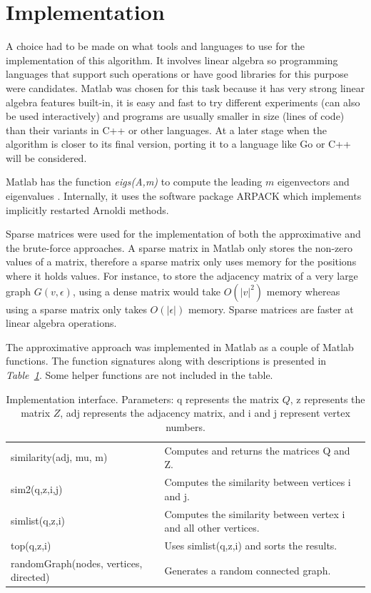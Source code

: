 \documentclass[12pt]{report}
\begin{document}
\section{Implementation}
%
A choice had to be made on what tools and languages to use for the implementation
of this algorithm. It involves linear algebra so programming languages that support
such operations or have good libraries for this purpose were candidates. Matlab
was chosen for this task because it has very strong linear algebra features built-in,
it is easy and fast to try different experiments (can also be used interactively)
and programs are usually smaller in size (lines of code) than their variants in C++
or other languages. At a later stage when the algorithm is closer to its final
version, porting it to a language like Go or C++ will be considered.


Matlab has the function \textit{eigs(A,m)} to compute the leading $m$ eigenvectors
and eigenvalues \cite{matlab:eigs}. Internally, it uses the software package ARPACK which implements
implicitly restarted Arnoldi methods. \cite{lehoucq1998arpack}


Sparse matrices were used for the implementation of both the approximative and
the brute-force approaches. A sparse matrix in Matlab only stores the non-zero
values of a matrix, therefore a sparse matrix only uses memory for the positions
where it holds values\cite{gilbert1992sparse}. For instance, to store the adjacency matrix of a very
large graph $G(v,\epsilon)$, using a dense matrix would take $O(|v|^2)$ memory
whereas using a sparse matrix only takes $O(|\epsilon|)$ memory. Sparse matrices
are faster at linear algebra operations.


The approximative approach was implemented in Matlab as a couple of Matlab functions.
The function signatures along with descriptions is presented in \emph{Table~\ref{tbl:interface}}.
Some helper functions are not included in the table.
%
\begin{table}[!ht]\footnotesize
   \centering
   \begin{tabular}{ll}
   similarity(adj, mu, m) & Computes and returns the matrices Q and Z. \\
   sim2(q,z,i,j) & Computes the similarity between vertices i and j. \\
   simlist(q,z,i) & Computes the similarity between vertex i and all other vertices. \\
   top(q,z,i) & Uses simlist(q,z,i) and sorts the results. \\
   randomGraph(nodes, vertices, directed) & Generates a random connected graph.
   \end{tabular}
   \caption{Implementation interface. Parameters: q represents the matrix $Q$, z represents the matrix $Z$, adj represents the adjacency matrix, and i and j represent vertex numbers.}
   \label{tbl:interface}
\end{table}
\end{document}
